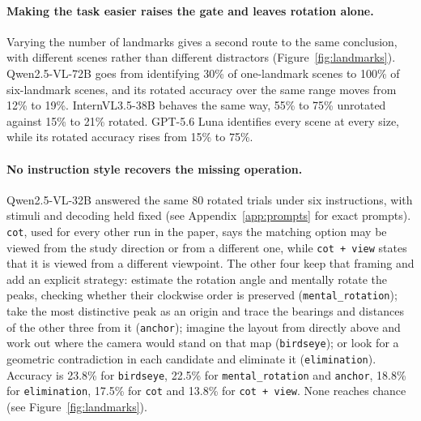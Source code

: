 \documentclass{article}
\begin{document}
\paragraph{Making the task easier raises the gate and leaves rotation alone.}
Varying the number of landmarks gives a second route to the same conclusion, with different scenes rather than different distractors (Figure~\ref{fig:landmarks}). Qwen2.5-VL-72B goes from identifying 30\% of one-landmark scenes to 100\% of six-landmark scenes, and its rotated accuracy over the same range moves from 12\% to 19\%.
InternVL3.5-38B behaves the same way, 55\% to 75\% unrotated against 15\% to 21\% rotated. GPT-5.6 Luna identifies every scene at every size, while its rotated accuracy rises from 15\% to 75\%.

\paragraph{No instruction style recovers the missing operation.}
Qwen2.5-VL-32B answered the same 80 rotated trials under six instructions, with stimuli and decoding held fixed (see Appendix~\ref{app:prompts} for exact prompts). \texttt{cot}, used for every other run in the paper, says the matching option may be viewed from the study direction or from a different one, while \texttt{cot + view} states that it is viewed from a different viewpoint. The other four keep that framing and add an explicit strategy: estimate the rotation angle and mentally rotate the peaks, checking whether their clockwise order is preserved (\texttt{mental\_rotation}); take the most distinctive peak as an origin and trace the bearings and distances of the other three from it
(\texttt{anchor}); imagine the layout from directly above and work out where the camera would stand on that map (\texttt{birdseye}); or look for a geometric contradiction in each candidate and eliminate it (\texttt{elimination}). Accuracy is 23.8\% for \texttt{birdseye}, 22.5\% for \texttt{mental\_rotation} and \texttt{anchor}, 18.8\% for \texttt{elimination}, 17.5\% for
\texttt{cot} and 13.8\% for \texttt{cot + view}. None reaches chance (see Figure~\ref{fig:landmarks}).
\end{document}
